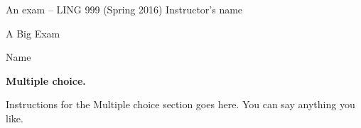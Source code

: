 \documentclass[12pt]{article}
\newenvironment{head}[1]%
{\large \textbf{#1}\begin{itshape}}%
{\end{itshape}\vspace{3mm}\normalsize}%
\begin{document}


An exam -- LING 999  (Spring 2016) \hfill Instructor's name\\


\begin{center}
\Large
A Big Exam
\end{center}

\vspace{5mm}
\large
Name \underline{\hspace*{5cm}}
\normalsize
\vspace{5mm}

\begin{head}{Multiple choice.}
Instructions for the Multiple choice section goes here. You can say anything you like.
\end{head}
\end{document}
